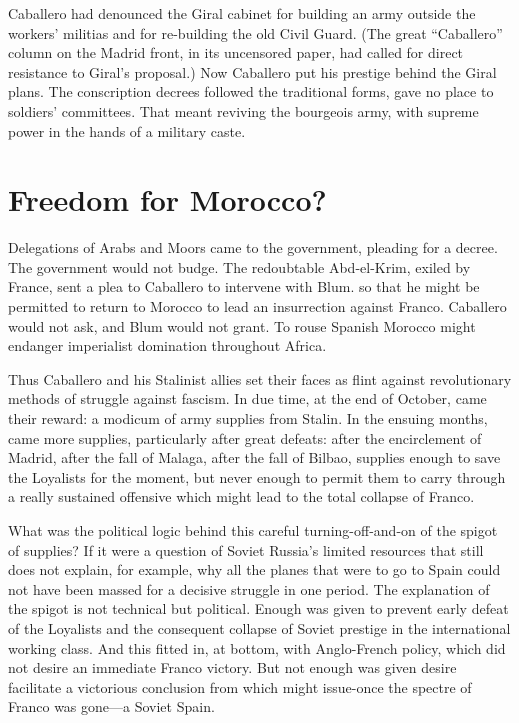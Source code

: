 Caballero had denounced the Giral cabinet for building an army outside the workers’ militias and for re-building the old Civil Guard. (The great ``Caballero'' column on the Madrid front, in its uncensored paper, had called for direct resistance to Giral’s proposal.) Now Caballero put his prestige behind the Giral plans. The conscription decrees followed the traditional forms, gave no place to soldiers’ committees. That meant reviving the bourgeois army, with supreme power in the hands of a military caste.

\section{Freedom for Morocco?}

Delegations of Arabs and Moors came to the government, pleading for a decree. The government would not budge. The redoubtable Abd-el-Krim, exiled by France, sent a plea to Caballero to intervene with Blum. so that he might be permitted to return to Morocco to lead an insurrection against Franco. Caballero would not ask, and Blum would not grant. To rouse Spanish Morocco might endanger imperialist domination throughout Africa.

Thus Caballero and his Stalinist allies set their faces as flint against revolutionary methods of struggle against fascism. In due time, at the end of October, came their reward: a modicum of army supplies from Stalin. In the ensuing months, came more supplies, particularly after great defeats: after the encirclement of Madrid, after the fall of Malaga, after the fall of Bilbao, supplies enough to save the Loyalists for the moment, but never enough to permit them to carry through a really sustained offensive which might lead to the total collapse of Franco.

What was the political logic behind this careful turning-off-and-on of the spigot of supplies? If it were a question of Soviet Russia’s limited resources that still does not explain, for example, why all the planes that were to go to Spain could not have been massed for a decisive struggle in one period. The explanation of the spigot is not technical but political. Enough was given to prevent early defeat of the Loyalists and the consequent collapse of Soviet prestige in the international working class. And this fitted in, at bottom, with Anglo-French policy, which did not desire an immediate Franco victory. But not enough was given desire facilitate a victorious conclusion from which might issue-once the spectre of Franco was gone---a Soviet Spain.


